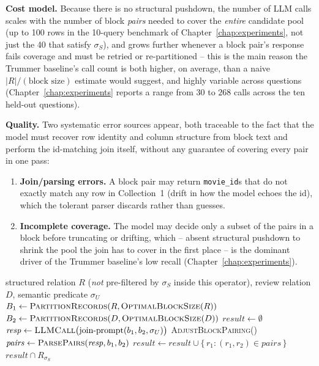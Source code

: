 \textbf{Cost model.} Because there is no structural pushdown, the number
of LLM calls scales with the number of block \emph{pairs} needed to
cover the \emph{entire} candidate pool (up to 100 rows in the 10-query
benchmark of Chapter~\ref{chap:experiments}, not just the 40 that
satisfy $\sigma_S$), and grows further whenever a block pair's response
fails coverage and must be retried or re-partitioned -- this is the main
reason the Trummer baseline's call count is both higher, on average,
than a naive $|R|/(\text{block size})$ estimate would suggest, and
highly variable across questions (Chapter~\ref{chap:experiments} reports
a range from $30$ to $268$ calls across the ten held-out questions).

\textbf{Quality.} Two systematic error sources appear, both traceable to
the fact that the model must recover row identity and column structure
from block text and perform the id-matching join itself, without any
guarantee of covering every pair in one pass:
\begin{enumerate}
  \item \textbf{Join/parsing errors.} A block pair may return
        \texttt{movie\_id}s that do not exactly match any row in
        Collection~1 (drift in how the model echoes the id), which the
        tolerant parser discards rather than guesses.
  \item \textbf{Incomplete coverage.} The model may decide only a subset
        of the pairs in a block before truncating or drifting, which --
        absent structural pushdown to shrink the pool the join has to
        cover in the first place -- is the dominant driver of the
        Trummer baseline's low recall (Chapter~\ref{chap:experiments}).
\end{enumerate}

\begin{algorithm}[h]
\caption{Trummer baseline: adaptive two-collection block join}
\label{alg:trummer-baseline}
\begin{algorithmic}[1]
\Require structured relation $R$ (\emph{not} pre-filtered by $\sigma_S$
inside this operator), review relation $D$, semantic predicate $\sigma_U$
\State $B_1 \gets \textsc{PartitionRecords}(R, \textsc{OptimalBlockSize}(R))$
\State $B_2 \gets \textsc{PartitionRecords}(D, \textsc{OptimalBlockSize}(D))$
\State $\mathit{result} \gets \emptyset$
  \State $\mathit{resp} \gets \textsc{LLMCall}\bigl(\text{join-prompt}(b_1, b_2, \sigma_U)\bigr)$ 
    \State \textsc{AdjustBlockPairing}() 
  \EndIf
  \State $\mathit{pairs} \gets \textsc{ParsePairs}(\mathit{resp}, b_1, b_2)$
  \State $\mathit{result} \gets \mathit{result} \cup \{\, r_1 : (r_1,r_2) \in \mathit{pairs} \,\}$
\EndFor
\State \Return $\mathit{result} \cap R_{\sigma_S}$ 
\end{algorithmic}
\end{algorithm}

